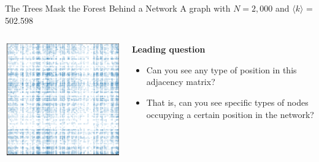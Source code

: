 \documentclass[show notes, aspectratio=1610]{beamer}
\begin{document}
\begin{frame}{The Trees Mask the Forest Behind a Network}
	{A graph with $N = 2,000$ and $\langle k \rangle$ = 502.598 }
	\begin{columns}
		\begin{column}{0.5\textwidth}
			\centering 
			\includegraphics[]{../images/random.pdf}

		\end{column}
		\begin{column}{0.3\textwidth}
			\textbf{Leading question}

			\begin{itemize}
				\item 
				Can you see any type of position in this 
				adjacency matrix?
				\item That is, can you see specific types of nodes 
				occupying a certain position in the network?
			\end{itemize}
		\end{column}
	\end{columns}
\end{frame}
\end{document}
